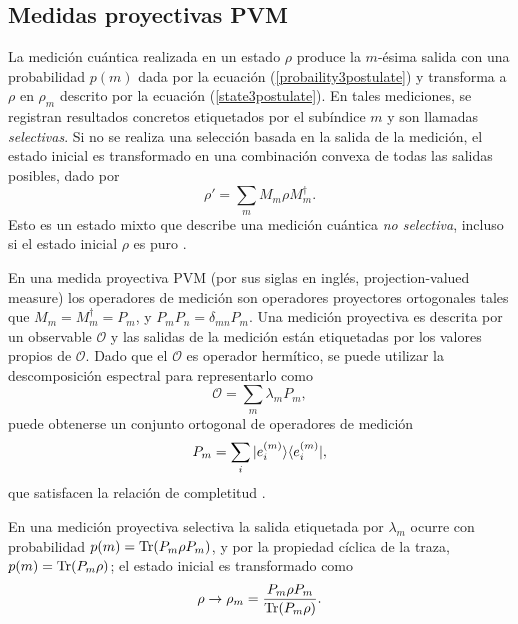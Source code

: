 

\subsection{Medidas proyectivas PVM} %
La medición cuántica realizada en un estado $\rho$ produce  la $m$-ésima 
salida con una probabilidad $p(m)$ dada por la ecuación
(\ref{probaility3postulate}) y transforma a $\rho $ en $\rho_m$ descrito por la
ecuación (\ref{state3postulate}). En tales mediciones, se registran resultados
concretos etiquetados por el subíndice $m$ y son llamadas \textit{selectivas}.
Si no se realiza una selección basada en la salida de la medición, el estado
inicial es transformado en una combinación convexa de todas las salidas
posibles, dado por 
\begin{equation}\label{non-selective-measure}
	\rho'=\sum_m M_m\rho M_m^\dagger.
\end{equation}
Esto es un estado mixto que  describe una medición cuántica \textit{no selectiva}, incluso si el estado inicial $\rho$ es puro {\cite{2007geometry}}.

En una medida proyectiva PVM (por sus siglas en inglés, projection-valued
measure) los operadores de medición son operadores proyectores ortogonales
tales que $M_{m}=M_{m}^{\dagger}=P_{m}$, y $P_{m}P_{n}=\delta_{mn}P_{m}$. Una
medición proyectiva es descrita por un observable $\mathcal{O}$ y las salidas
de la medición están etiquetadas por los valores propios de $\mathcal{O}$. Dado
que el $\mathcal{O}$ es operador hermítico, se puede utilizar la descomposición
espectral para representarlo como \begin{equation}
	\mathcal{O}=\sum_m \lambda_m P_m,
\end{equation} puede obtenerse un conjunto ortogonal de operadores de medición \[P_m=\sum_i
|e_i^{(m)}\rangle \langle e_i^{(m)}|,\] que satisfacen la relación de completitud
{\cite{2007geometry}}. 

En una medición proyectiva selectiva la salida etiquetada por $\lambda_m$
ocurre con probabilidad $p(m)={\rm Tr}(P_m\rho P_m)$, y por la propiedad cíclica de
la traza,  $p(m)={\rm Tr}(P_m\rho)$; el estado inicial es transformado como 
\begin{equation}\label{stateProjective}
	\rho\to	\rho_m=\dfrac{P_m\rho P_m}{{\rm Tr}(P_m \rho)}.
\end{equation}

